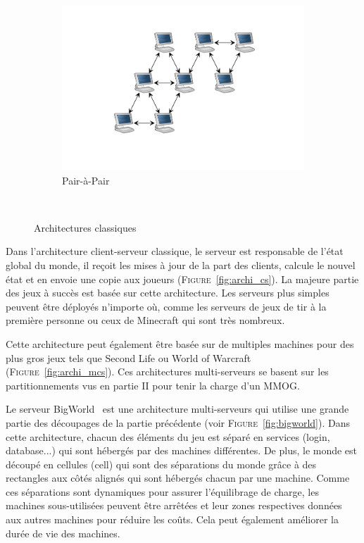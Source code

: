 \begin{figure}[b!]
\begin{subfigure}[t]{0.3\textwidth}
			\includegraphics[width=\textwidth]{p2p.png}
			\caption{Pair-à-Pair}
			\label{fig:archi_p2p}
		\end{subfigure}
		\\[0.2cm]
	\caption{Architectures classiques}
	\label{fig:archi}
\end{figure}
Dans l'architecture client-serveur classique, le serveur est responsable de l'état global du monde, il reçoit les mises à jour de la part des clients, calcule le nouvel état et en envoie une copie aux joueurs (\textsc{Figure}~\ref{fig:archi_cs}).
La majeure partie des jeux à succès est basée sur cette architecture.
Les serveurs plus simples peuvent être déployés n'importe où, comme les serveurs de jeux de tir à la première personne ou ceux de Minecraft qui sont très nombreux.

Cette architecture peut également être basée sur de multiples machines pour des plus gros jeux tels que Second Life ou World of Warcraft (\textsc{Figure}~\ref{fig:archi_mcs}).
Ces architectures multi-serveurs se basent sur les partitionnements vus en partie II pour tenir la charge d'un MMOG.

Le serveur BigWorld~\cite{bigworld} est une architecture multi-serveurs qui utilise une grande partie des découpages de la partie précédente (voir \textsc{Figure}~\ref{fig:bigworld}).
Dans cette architecture, chacun des éléments du jeu est séparé en services (login, database...) qui sont hébergés par des machines différentes.
De plus, le monde est découpé en cellules (cell) qui sont des séparations du monde grâce à des rectangles aux côtés alignés qui sont hébergés chacun par une machine.
Comme ces séparations sont dynamiques pour assurer l'équilibrage de charge, les machines sous-utilisées peuvent être arrêtées et leur zones respectives données aux autres machines pour réduire les coûts.
Cela peut également améliorer la durée de vie des machines.

